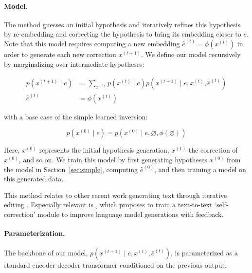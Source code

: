 \documentclass[11pt]{article}
\begin{document}

\paragraph{Model.} The method guesses an initial hypothesis and iteratively refines this hypothesis by re-embedding and correcting the hypothesis to bring its embedding closer to $e$. Note that this model requires computing a new embedding  $\hat{e}^{(t)}= \phi(x^{(t)})$ in order to generate each new correction $x^{(t+1)}$. We define our model recursively by marginalizing over intermediate hypotheses:

\begin{align*}
    p(x^{(t+1)} \mid e) &= \sum_{x^{(t)}}  p(x^{(t)} \mid e) p(x^{(t+1)} \mid e, x^{(t)}, \hat{e}^{(t)})\\
    \hat{e}^{(t)} &= \phi(x^{(t)})
\end{align*}

\noindent with a base case of the simple learned inversion:

\[
p(x^{(0)} \mid e) = p(x^{(0)} \mid e, \varnothing, \phi(\varnothing))
\]

\noindent %
Here, $x^{(0)}$ represents the initial hypothesis generation, $x^{(1)}$ the correction of $x^{(0)}$, and so on. We train this model by first generating hypotheses $x^{(0)}$ from the model in Section~\ref{sec:simple}, computing $\hat{e}^{(0)}$,  and then training a model on this generated data.

This method relates to other recent work generating text through iterative editing \cite{lee2018deterministic, ghazvininejad2019maskpredict}. Especially relevant is \citet{welleck2022generating}, which proposes to train a text-to-text `self-correction' module to improve language model generations with feedback. %


\paragraph{Parameterization.} The backbone of our model, $p(x^{(t+1)} \mid e, x^{(t)}, \hat{e}^{(t)})$, is parameterized as a standard encoder-decoder transformer \cite{vaswani2017attention,raffel2020t5} conditioned on the previous output.
\end{document}
